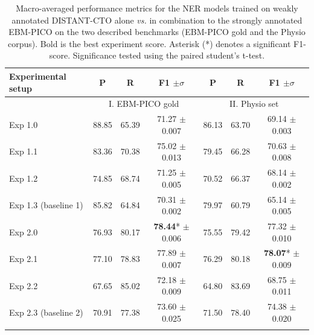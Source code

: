 \documentclass[11pt]{article}
\begin{document}
\begin{table}[hbt!]
    \centering
    \begin{tabular}{lccc|ccc}
        \Xhline{1pt}
        Experimental setup & P & R & F1 $\pm\sigma$ & P & R & F1 $\pm\sigma$\\
        \hline 
        & \multicolumn{3}{c}{I. EBM-PICO gold} & \multicolumn{3}{c}{II. Physio set}  \\
        Exp 1.0 & 88.85 & 65.39 & 71.27 $\pm$0.007 & 86.13 & 63.70 & 69.14 $\pm$0.003\\
        Exp 1.1 & 83.36 & 70.38 & 75.02 $\pm$0.013 & 79.45 & 66.28 & 70.63 $\pm$0.008\\
        Exp 1.2 & 74.85 & 68.74 & 71.25 $\pm$0.005 & 70.52 & 66.37 & 68.14 $\pm$0.002 \\
        Exp 1.3 (baseline 1) & 85.82 & 64.84 & 70.31 $\pm$0.002 & 79.97 & 60.79 & 65.14 $\pm$0.005 \\
        Exp 2.0 & 76.93  & 80.17  & \textbf{78.44}* $\pm$0.006 & 75.55  & 79.42 & 77.32 $\pm$0.010\\
        Exp 2.1 & 77.10 & 78.83 & 77.89 $\pm$0.007 & 76.29 & 80.18 & \textbf{78.07}* $\pm$0.009\\
        Exp 2.2 & 67.65 & 85.02 & 72.18 $\pm$0.009  & 64.80 & 83.69 & 68.75 $\pm$0.011 \\
        Exp 2.3 (baseline 2) & 70.91 & 77.38 & 73.60 $\pm$0.025 & 71.50 & 78.40 & 74.38 $\pm$0.020 \\
        \Xhline{1pt}
    \end{tabular}
    \caption{Macro-averaged performance metrics for the NER models trained on weakly annotated DISTANT-CTO alone \textit{vs.} in combination to the strongly annotated EBM-PICO on the two described benchmarks (EBM-PICO gold and the Physio corpus). Bold is the best experiment score. Asterisk (*) denotes a significant F1-score. Significance tested using the paired student's t-test.}
    \label{tab:results_modeltraining}
\end{table}
%
%
%
%
%
%
\end{document}
